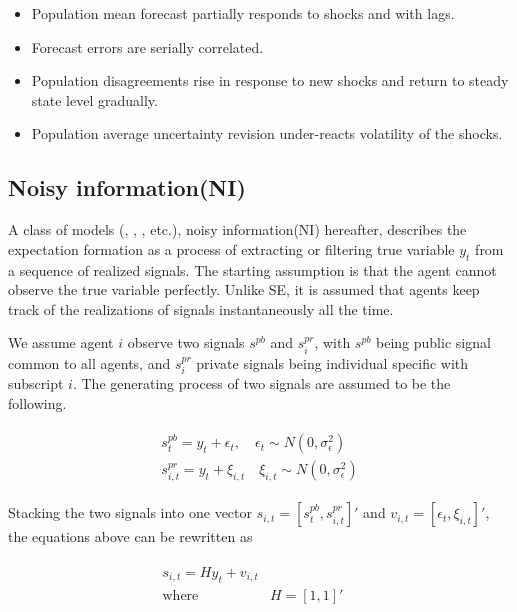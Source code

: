 \documentclass[12pt]{article}
\begin{document}
	\begin{itemize}
		\item Population mean forecast partially responds to shocks and with lags. 
		\item Forecast errors are serially correlated. 
		\item Population disagreements rise in response to new shocks and return to steady state level gradually. 
		\item Population average uncertainty revision under-reacts volatility of the shocks.
	\end{itemize}
	
	\subsection{Noisy information(NI)}
	
	A class of models (\citet{lucas1972expectations}, \citet{sims2003implications}, \cite{woodford2001imperfect}, etc.), noisy information(NI) hereafter, describes the expectation formation as a process of extracting or filtering true variable $y_t$ from a sequence of realized signals.  The starting assumption is that the agent cannot observe the true variable perfectly. Unlike SE, it is assumed that agents keep track of the realizations of signals instantaneously all the time. 
	
	We assume agent $i$ observe two signals $s^{pb}$ and $s^{pr}_i$, with $s^{pb}$ being public signal common to all agents, and $s^{pr}_i$ private signals being individual specific with subscript $i$. The generating process of two signals are assumed to be the following.
	
	\begin{eqnarray}\label{NISigDef}
		\begin{aligned}
			s^{pb}_t = y_t + \epsilon_t, \quad \epsilon_t \sim N(0,\sigma^2_\epsilon)\\ 
			s^{pr}_{i,t} = y_t + \xi_{i,t} \quad \xi_{i,t} \sim N(0,\sigma^2_\epsilon)
		\end{aligned}
	\end{eqnarray}
	
	Stacking the two signals into one vector $s_{i,t} = [s^{pb}_t,s^{pr}_{i,t}]'$ and $v_{i,t}= [\epsilon_t,\xi_{i,t}]'$, the equations above can be rewritten as 
	
	\begin{eqnarray}
		\begin{aligned}
			s_{i,t} = H y_{t} + v_{i,t} \\
			\text{where } & H=[1,1]' \quad \\
		\end{aligned}
	\end{eqnarray}
	
\end{document}
